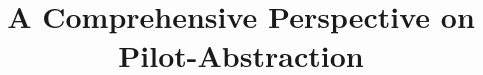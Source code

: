 \documentclass{sig-alternate}
\begin{document}

\title{A Comprehensive Perspective on Pilot-Abstraction}

\end{document}
